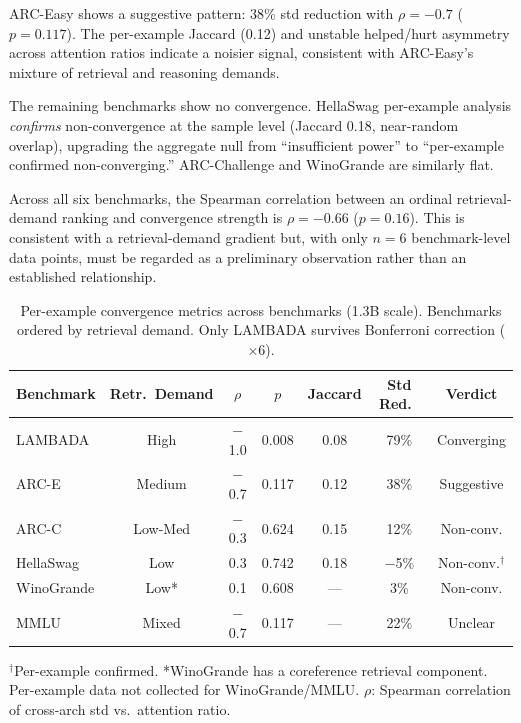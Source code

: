 \documentclass[11pt,a4paper]{article}
\begin{document}
ARC-Easy shows a suggestive pattern: 38\% std reduction with $\rho{=}{-}0.7$ ($p{=}0.117$). The per-example Jaccard (0.12) and unstable helped/hurt asymmetry across attention ratios indicate a noisier signal, consistent with ARC-Easy's mixture of retrieval and reasoning demands.

The remaining benchmarks show no convergence. HellaSwag per-example analysis \emph{confirms} non-convergence at the sample level (Jaccard 0.18, near-random overlap), upgrading the aggregate null from ``insufficient power'' to ``per-example confirmed non-converging.'' ARC-Challenge and WinoGrande are similarly flat.

Across all six benchmarks, the Spearman correlation between an ordinal retrieval-demand ranking and convergence strength is $\rho{=}{-}0.66$ ($p{=}0.16$). This is consistent with a retrieval-demand gradient but, with only $n{=}6$ benchmark-level data points, must be regarded as a preliminary observation rather than an established relationship.

\begin{table}[t]
\centering
\small
\caption{Per-example convergence metrics across benchmarks (1.3B scale). Benchmarks ordered by retrieval demand. Only LAMBADA survives Bonferroni correction ($\times 6$).}
\label{tab:benchmark-convergence}
\begin{tabular}{@{}lcccccc@{}}
\toprule
Benchmark & Retr.\ Demand & $\rho$ & $p$ & Jaccard & Std Red.\ & Verdict \\
\midrule
LAMBADA & High & $-$1.0 & 0.008 & 0.08 & 79\% & Converging \\
ARC-E & Medium & $-$0.7 & 0.117 & 0.12 & 38\% & Suggestive \\
ARC-C & Low-Med & $-$0.3 & 0.624 & 0.15 & 12\% & Non-conv. \\
HellaSwag & Low & 0.3 & 0.742 & 0.18 & $-$5\% & Non-conv.$^\dagger$ \\
WinoGrande & Low* & 0.1 & 0.608 & --- & 3\% & Non-conv. \\
MMLU & Mixed & $-$0.7 & 0.117 & --- & 22\% & Unclear \\
\bottomrule
\end{tabular}

\vspace{2pt}
{\footnotesize $^\dagger$Per-example confirmed. *WinoGrande has a coreference retrieval component. Per-example data not collected for WinoGrande/MMLU. $\rho$: Spearman correlation of cross-arch std vs.\ attention ratio.}
\end{table}
\end{document}
